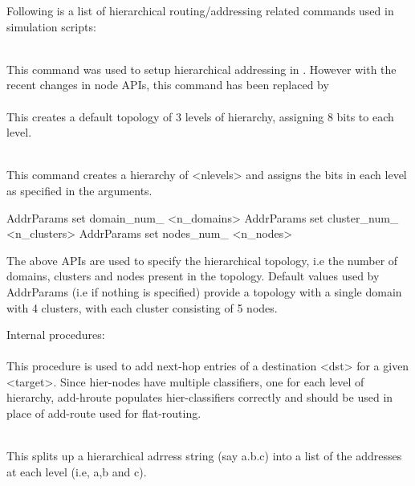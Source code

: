Following is a list of hierarchical routing/addressing related commands
used in simulation scripts:
\begin{flushleft}
\\
This command was used to setup hierarchical addressing in \ns. However with
the recent changes in node APIs, this command has been replaced by\\
\\
This creates a default topology of 3 levels of hierarchy, assigning 8 bits
to each level.


\\
This command creates a hierarchy of <nlevels> and assigns the bits in each level
as specified in the arguments.


\begin{program}
AddrParams set domain_num_ <n_domains>
AddrParams set cluster_num_ <n_clusters>
AddrParams set nodes_num_ <n_nodes>
\end{program}
The above APIs are used to specify the hierarchical topology, i.e the number of
domains, clusters and nodes present in the topology. Default values used by
AddrParams (i.e if nothing is specified) provide a topology with a single
domain with 4 clusters, with each cluster consisting of 5 nodes.


Internal procedures:\\

\\
This procedure is used to add next-hop entries of a destination <dst> for a
given <target>. Since hier-nodes have multiple classifiers, one for each level
of hierarchy, add-hroute populates hier-classifiers correctly and should be
used in place of add-route used for flat-routing.


\\
This splits up a hierarchical adrress string  (say a.b.c) into a list of
the addresses at each level (i.e, a,b and c).

\end{flushleft}

\endinput
